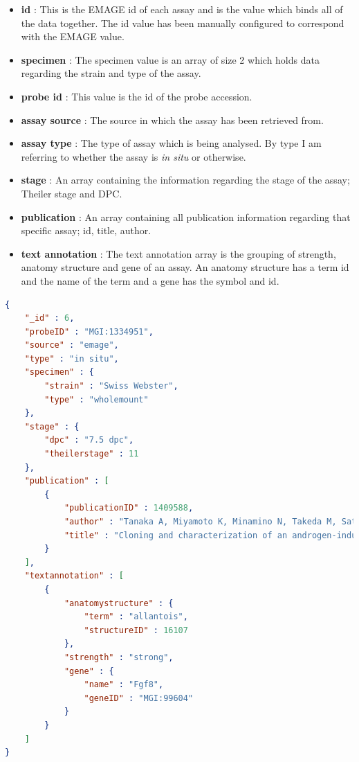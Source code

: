\begin{itemize}
\item \textbf{id} : This is the EMAGE id of each assay and is the value which binds all of the data together. The id value has been manually configured to correspond with the EMAGE value.
\item \textbf{specimen} : The specimen value is an array of size 2 which holds data regarding the strain and type of the assay.
\item \textbf{probe id} : This value is the id of the probe accession.
\item \textbf{assay source} : The source in which the assay has been retrieved from.
\item \textbf{assay type} : The type of assay which is being analysed. By type I am referring to whether the assay is \textit{in situ} or otherwise.
\item \textbf{stage} : An array containing the information regarding the stage of the assay; Theiler stage and DPC.
\item \textbf{publication} : An array containing all publication information regarding that specific assay; id, title, author.
\item \textbf{text annotation} : The text annotation array is the grouping of strength, anatomy structure and gene of an assay. An anatomy structure has a term id and the name of the term and a gene has the symbol and id.
\end{itemize}

\newpage
\begin{lstlisting}[language=json,caption=Example MongoDB document., label=code:mongoload]
{
    "_id" : 6,
    "probeID" : "MGI:1334951",
    "source" : "emage",
    "type" : "in situ",
    "specimen" : {
        "strain" : "Swiss Webster",
        "type" : "wholemount"
    },
    "stage" : {
        "dpc" : "7.5 dpc",
        "theilerstage" : 11
    },
    "publication" : [ 
        {
            "publicationID" : 1409588,
            "author" : "Tanaka A, Miyamoto K, Minamino N, Takeda M, Sato B, Matsuo H, Matsumoto K",
            "title" : "Cloning and characterization of an androgen-induced growth factor essential for the androgen-dependent growth of mouse mammary carcinoma cells."
        }
    ],
    "textannotation" : [ 
        {
            "anatomystructure" : {
                "term" : "allantois",
                "structureID" : 16107
            },
            "strength" : "strong",
            "gene" : {
                "name" : "Fgf8",
                "geneID" : "MGI:99604"
            }
        }
    ]
}
\end{lstlisting}
\newpage
